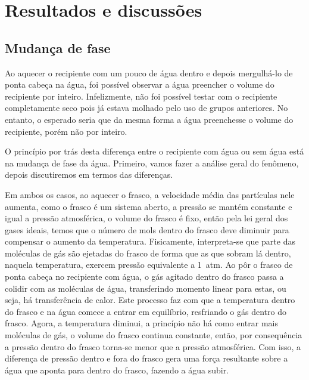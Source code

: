 \section{Resultados e discussões}

\subsection{Mudança de fase} %
Ao aquecer o recipiente com um pouco de água dentro e depois mergulhá-lo de ponta cabeça na água, foi possível observar a água preencher o volume do recipiente por inteiro. Infelizmente, não foi possível testar com o recipiente completamente seco pois já estava molhado pelo uso de grupos anteriores. No entanto, o esperado seria que da mesma forma a água preenchesse o volume do recipiente, porém não por inteiro. 

O princípio por trás desta diferença entre o recipiente com água ou sem água está na mudança de fase da água. Primeiro, vamos fazer a análise geral do fenômeno, depois discutiremos em termos das diferenças. 

Em ambos os casos, ao aquecer o frasco, a velocidade média das partículas nele aumenta, como o frasco é um sistema aberto, a pressão se mantém constante e igual a pressão atmosférica, o volume do frasco é fixo, então pela lei geral dos gases ideais, temos que o número de mols dentro do frasco deve diminuir para compensar o aumento da temperatura. Fisicamente, interpreta-se que parte das moléculas de gás são ejetadas do frasco de forma que as que sobram lá dentro, naquela temperatura, exercem pressão equivalente a \qty{1}{atm}. Ao pôr o frasco de ponta cabeça no recipiente com água, o gás agitado dentro do frasco passa a colidir com as moléculas de água, transferindo momento linear para estas, ou seja, há transferência de calor. Este processo faz com que a temperatura dentro do frasco e na água comece a entrar em equilíbrio, resfriando o gás dentro do frasco. Agora, a temperatura diminui, a princípio não há como entrar mais moléculas de gás, o volume do frasco continua constante, então, por consequência a pressão dentro do frasco torna-se menor que a pressão atmosférica. Com isso, a diferença de pressão dentro e fora do frasco gera uma força resultante sobre a água que aponta para dentro do frasco, fazendo a água subir.


